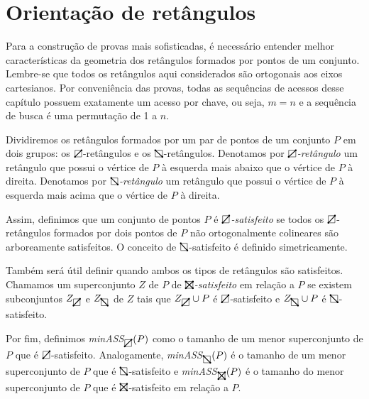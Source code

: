 \section{Orientação de retângulos}

Para a construção de provas mais sofisticadas, é necessário entender melhor características da geometria dos retângulos formados por pontos de um conjunto. Lembre-se que todos os retângulos aqui considerados são ortogonais aos eixos cartesianos. Por conveniência das provas, todas as sequências de acessos desse capítulo possuem exatamente um acesso por chave, ou seja, $m = n$ e a sequência de busca é uma permutação de 1 a $n$.

Dividiremos os retângulos formados por um par de pontos de um conjunto $P$ em dois grupos: os $\rectpos$-retângulos e os $\rectneg$-retângulos. Denotamos por $\rectpos$\textit{-retângulo} um retângulo que possui o vértice de $P$ à esquerda mais abaixo que o vértice de $P$ à direita. Denotamos por $\rectneg$\textit{-retângulo} um retângulo que possui o vértice de $P$ à esquerda mais acima que o vértice de $P$ à direita.

Assim, definimos que um conjunto de pontos $P$ é $\rectpos$\textit{-satisfeito} se todos os $\rectpos$-retângulos formados por dois pontos de $P$ não ortogonalmente colineares são arboreamente satisfeitos. O conceito de $\rectneg$-satisfeito é definido simetricamente.

Também será útil definir quando ambos os tipos de retângulos são satisfeitos. Chamamos um superconjunto $Z$ de $P$ de $\recttotal$\textit{-satisfeito} em relação a $P$ se existem subconjuntos $Z_{\rectpos}$ e $Z_{\rectneg}$ de $Z$ tais que $Z_{\rectpos} \cup P$ é $\rectpos$-satisfeito e $Z_{\rectneg} \cup P$ é $\rectneg$-satisfeito.  


Por fim, definimos \textit{minASS}$_{\rectpos}(P)$ como o tamanho de um menor superconjunto de $P$ que é $\rectpos$-satisfeito. Analogamente, \textit{minASS}$_{\rectneg}(P)$ é o tamanho de um menor superconjunto de $P$ que é $\rectneg$-satisfeito e \textit{minASS}$_{\recttotal}(P)$ é o tamanho do menor superconjunto de $P$ que é $\recttotal$-satisfeito em relação a $P$.

